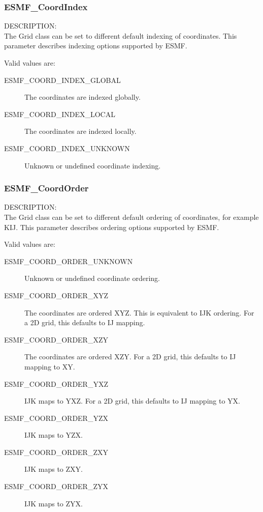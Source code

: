 

 \subsubsection{ESMF\_CoordIndex}

 {\sf DESCRIPTION:\\}
 The Grid class can be set to different default indexing of coordinates.  This
 parameter describes indexing options supported by ESMF.

 Valid values are:
 \begin{description}
    \item [ESMF\_COORD\_INDEX\_GLOBAL]
          The coordinates are indexed globally.

    \item [ESMF\_COORD\_INDEX\_LOCAL]
          The coordinates are indexed locally.  
 
    \item [ESMF\_COORD\_INDEX\_UNKNOWN]
          Unknown or undefined coordinate indexing.
 \end{description}


 \subsubsection{ESMF\_CoordOrder}

 {\sf DESCRIPTION:\\}
 The Grid class can be set to different default ordering of coordinates, for
 example KIJ.  This parameter describes ordering options supported by ESMF.

 Valid values are:
 \begin{description}
    \item [ESMF\_COORD\_ORDER\_UNKNOWN]
          Unknown or undefined coordinate ordering.

    \item [ESMF\_COORD\_ORDER\_XYZ]
          The coordinates are ordered XYZ.  This is equivalent to IJK ordering.
          For a 2D grid, this defaults to IJ mapping.

    \item [ESMF\_COORD\_ORDER\_XZY]
          The coordinates are ordered XZY.  For a 2D grid, this defaults to IJ 
          mapping to XY.

    \item [ESMF\_COORD\_ORDER\_YXZ]
          IJK maps to YXZ.  For a 2D grid, this defaults to IJ mapping to YX.

    \item [ESMF\_COORD\_ORDER\_YZX]
          IJK maps to YZX.

    \item [ESMF\_COORD\_ORDER\_ZXY]
          IJK maps to ZXY.

    \item [ESMF\_COORD\_ORDER\_ZYX]
          IJK maps to ZYX.
 
 \end{description}


